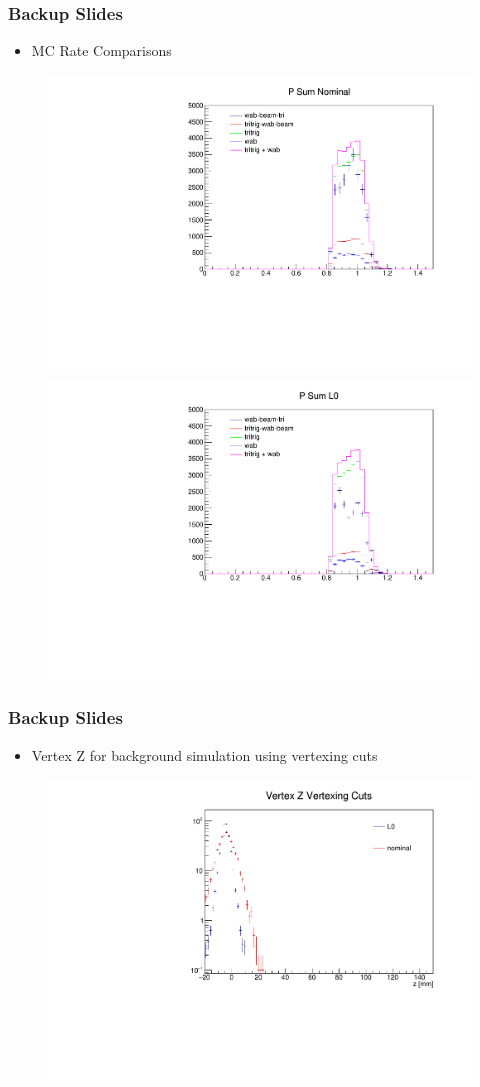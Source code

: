 \documentclass{beamer}
\begin{document}

\begin{frame}
\frametitle{Backup Slides}

\begin{itemize}
\item MC Rate Comparisons
\end{itemize}

\begin{figure}
\includegraphics[width=0.55\linewidth]{figs/psum.pdf}
\includegraphics[width=0.55\linewidth]{figs/psum_L0.pdf}
\end{figure}

\end{frame}


\begin{frame}
\frametitle{Backup Slides}

\begin{itemize}
\item Vertex Z for background simulation using vertexing cuts
\end{itemize}

\begin{figure}
\includegraphics[width=0.55\linewidth]{figs/log_uncVZ_vertcuts.pdf}
\end{figure}

\end{frame}
\end{document}
